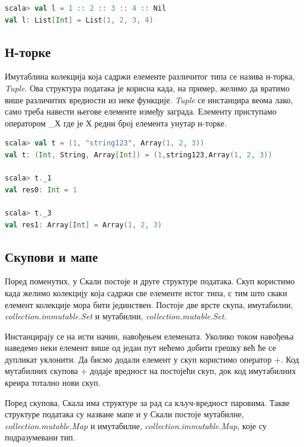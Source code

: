 \documentclass[12pt,oneside]{memoir}
\begin{document}
\begin{lstlisting}[language=Scala]
scala> val l = 1 :: 2 :: 3 :: 4 :: Nil
val l: List[Int] = List(1, 2, 3, 4)
\end{lstlisting}

\subsection{Н-торке}
\label{subsec:scala_tuple}

Имутаблина колекција која садржи елементе различитог типа се назива н-торка, \textit{Tuple}. Ова структура података је корисна када, на пример, желимо да вратимо више различитих вредности из неке функције. \textit{Tuple} се инстанцира веома лако, само треба навести његове елементе између заграда. Елементу приступамо оператором \_Х где је Х редни број елемента унутар н-торке. \cite{scala_prog}

\begin{lstlisting}[language=Scala]
scala> val t = (1, "string123", Array(1, 2, 3))
val t: (Int, String, Array[Int]) = (1,string123,Array(1, 2, 3))

scala> t._1
val res0: Int = 1

scala> t._3
val res1: Array[Int] = Array(1, 2, 3)
\end{lstlisting}

\subsection{Скупови и мапе}
\label{subsec:scala_sets_maps}

Поред поменутих, у Скали постоје и друге структуре података. Скуп користимо када желимо колекцију која садржи све елементе истог типа, с тим што сваки елемент колекције мора бити јединствен. Постоје две врсте скупа, имутабилни, \textit{collection.immutable.Set} и мутабилни, \textit{collection.mutable.Set}.

Инстанцирају се на исти начин, навођењем елемената. Уколико током навођења наведемо неки елемент више од један пут нећемо добити грешку већ ће се дупликат уклонити. Да бисмо додали елемент у скуп користимо оператор $+$. Код мутабилних скупова $+$ додаје вредност на постојећи скуп, док код имутабилних креира тотално нови скуп. \cite{scala_prog}

Поред скупова, Скала има структуре за рад са кључ-вредност паровима. Такве структуре података су назване мапе и у Скали постоје мутабилне, \textit{collection.mutable.Map} и имутабилне, \textit{collection.immutable.Map}, које су подразумевани тип.
\end{document}
